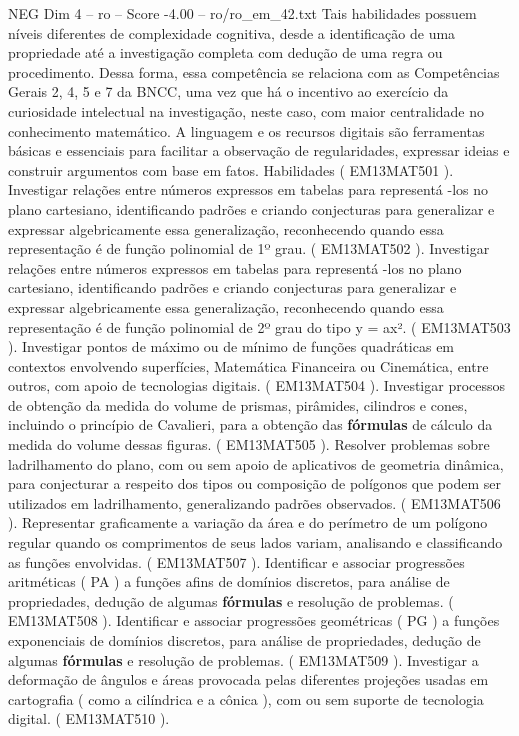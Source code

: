 \begin{textsample}{NEG Dim 4 – ro – Score -4.00 – ro/ro\_em\_42.txt}
Tais habilidades possuem níveis diferentes de complexidade cognitiva, desde a identificação de uma propriedade até a investigação completa com dedução de uma regra ou procedimento.
Dessa forma, essa competência se relaciona com as Competências Gerais 2, 4, 5 e 7 da BNCC, uma vez que há o incentivo ao exercício da curiosidade intelectual na investigação, neste caso, com maior centralidade no conhecimento matemático.
A linguagem e os recursos digitais são ferramentas básicas e essenciais para facilitar a observação de regularidades, expressar ideias e construir argumentos com base em fatos.
Habilidades ( EM13MAT501 ).
Investigar relações entre números expressos em tabelas para representá -los no plano cartesiano, identificando padrões e criando conjecturas para generalizar e expressar algebricamente essa generalização, reconhecendo quando essa representação é de função polinomial de 1º grau. ( EM13MAT502 ).
Investigar relações entre números expressos em tabelas para representá -los no plano cartesiano, identificando padrões e criando conjecturas para generalizar e expressar algebricamente essa generalização, reconhecendo quando essa representação é de função polinomial de 2º grau do tipo y = ax². ( EM13MAT503 ).
Investigar pontos de máximo ou de mínimo de funções quadráticas em contextos envolvendo superfícies, Matemática Financeira ou Cinemática, entre outros, com apoio de tecnologias digitais. ( EM13MAT504 ).
Investigar processos de obtenção da medida do volume de prismas, pirâmides, cilindros e cones, incluindo o princípio de Cavalieri, para a obtenção das \textbf{fórmulas} de cálculo da medida do volume dessas figuras. ( EM13MAT505 ).
Resolver problemas sobre ladrilhamento do plano, com ou sem apoio de aplicativos de geometria dinâmica, para conjecturar a respeito dos tipos ou composição de polígonos que podem ser utilizados em ladrilhamento, generalizando padrões observados. ( EM13MAT506 ).
Representar graficamente a variação da área e do perímetro de um polígono regular quando os comprimentos de seus lados variam, analisando e classificando as funções envolvidas. ( EM13MAT507 ).
Identificar e associar progressões aritméticas ( PA ) a funções afins de domínios discretos, para análise de propriedades, dedução de algumas \textbf{fórmulas} e resolução de problemas. ( EM13MAT508 ).
Identificar e associar progressões geométricas ( PG ) a funções exponenciais de domínios discretos, para análise de propriedades, dedução de algumas \textbf{fórmulas} e resolução de problemas. ( EM13MAT509 ).
Investigar a deformação de ângulos e áreas provocada pelas diferentes projeções usadas em cartografia ( como a cilíndrica e a cônica ), com ou sem suporte de tecnologia digital. ( EM13MAT510 ).

\end{textsample}
